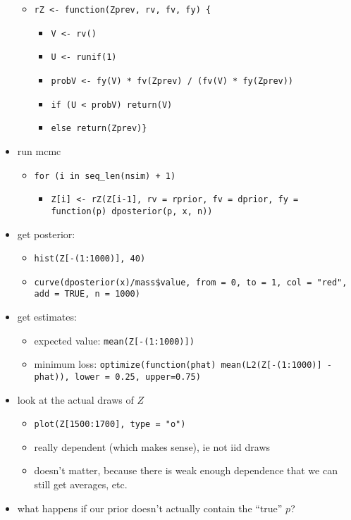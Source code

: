 \documentclass[11pt]{article}
\begin{document}
\begin{itemize}
\begin{itemize}
\item \texttt{rZ <- function(Zprev, rv, fv, fy) \{}
\begin{itemize}
\item \texttt{V <- rv()}
\item \texttt{U <- runif(1)}
\item \texttt{probV <- fy(V) * fv(Zprev) / (fv(V) * fy(Zprev))}
\item \texttt{if (U < probV) return(V)}
\item \texttt{else return(Zprev)\}}
\end{itemize}
\end{itemize}
\item run mcmc
\begin{itemize}
\item \texttt{for (i in seq\_len(nsim) + 1)}
\begin{itemize}
\item \texttt{Z[i] <- rZ(Z[i-1], rv = rprior, fv = dprior, fy = function(p) dposterior(p, x, n))}
\end{itemize}
\end{itemize}
\item get posterior:
\begin{itemize}
\item \texttt{hist(Z[-(1:1000)], 40)}
\item \texttt{curve(dposterior(x)/mass\$value, from = 0, to = 1, col = "red", add = TRUE, n = 1000)}
\end{itemize}
\item get estimates:
\begin{itemize}
\item expected value: \texttt{mean(Z[-(1:1000)])}
\item minimum loss: \texttt{optimize(function(phat) mean(L2(Z[-(1:1000)] - phat)), lower = 0.25, upper=0.75)}
\end{itemize}
\item look at the actual draws of $Z$
\begin{itemize}
\item \texttt{plot(Z[1500:1700], type = "o")}
\item really dependent (which makes sense), ie not iid draws
\item doesn't matter, because there is weak enough dependence that we
         can still get averages, etc.
\end{itemize}
\item what happens if our prior doesn't actually contain the ``true'' $p$?

\end{itemize}
\end{document}
